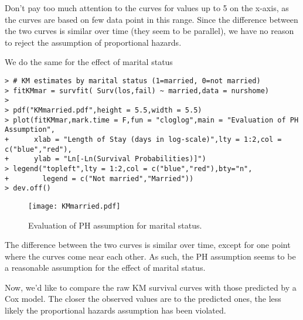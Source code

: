 \begin{enumerate}[(i)]
Don't pay too much attention to the curves for values up to 5 on the x-axis, as the curves are based on few data point in this range. Since the difference between the two curves is similar over time (they seem to be parallel), we have no reason to reject the assumption of proportional hazards.

We do the same for the effect of marital status
\begin{spacing}{1.2}
\begin{footnotesize}
\begin{verbatim}
> # KM estimates by marital status (1=married, 0=not married)
> fitKMmar = survfit( Surv(los,fail) ~ married,data = nurshome)
> 
> pdf("KMmarried.pdf",height = 5.5,width = 5.5)
> plot(fitKMmar,mark.time = F,fun = "cloglog",main = "Evaluation of PH Assumption",
+      xlab = "Length of Stay (days in log-scale)",lty = 1:2,col = c("blue","red"),
+      ylab = "Ln[-Ln(Survival Probabilities)]")
> legend("topleft",lty = 1:2,col = c("blue","red"),bty="n",
+        legend = c("Not married","Married"))
> dev.off()
\end{verbatim}
\end{footnotesize}
\end{spacing}

\begin{figure}[htbp]
	\centering
		\texttt{[image: KMmarried.pdf]}
	\caption{Evaluation of PH assumption for marital status.}
	\label{figure2}
\end{figure}

The  difference  between  the  two 
curves is similar over time, except for one point where the curves come near each other. As such, the PH assumption seems to be a reasonable assumption for the effect of marital status. 

Now, we'd like to compare the raw KM survival curves with those predicted by a Cox model. 
The closer the observed values are to the predicted ones, the less 
likely the proportional hazards assumption has been violated. 


\end{enumerate}
